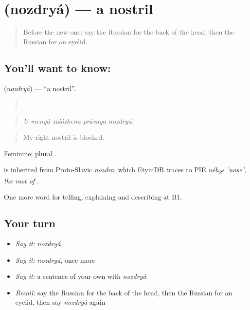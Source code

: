 \section[\texorpdfstring{\ru{ноздря} (nozdryá)}{ноздря (nozdryá)}]{ (nozdryá) — a nostril}

\label{lesson:RU-C482-nozdrya}



\begin{quote}
Before the new one: say the Russian for the back of the head, then the Russian for an eyelid.
\end{quote}

\subsection*{You'll want to know: }
\textbf{} (\emph{nozdryá}) — \textquotedblleft{}a nostril\textquotedblright{}.

\begin{quote}
    .
\end{quote}

\begin{quote}
\emph{U menyá zalózhena právaya nozdryá.}
\end{quote}

\begin{quote}
My right nostril is blocked.
\end{quote}

Feminine; plural .

\begin{cousinweb}
\emph{} is inherited from Proto-Slavic \emph{nozdra}, which EtymDB traces to PIE \emph{néh\textsubscript{2}s 'nose', the root of }\emph{.}
\end{cousinweb}

\begin{grammarlens}[title={What you've built}]
One more word for telling, explaining and describing at B1.
\end{grammarlens}

\subsection*{Your turn}
\begin{itemize}
\raggedright
  \item \emph{Say it:} \emph{nozdryá}
  \item \emph{Say it:} \emph{nozdryá}, once more
  \item \emph{Say it:} a sentence of your own with \emph{nozdryá}
  \item \emph{Recall:} say the Russian for the back of the head, then the Russian for an eyelid, then say \emph{nozdryá} again
\end{itemize}

